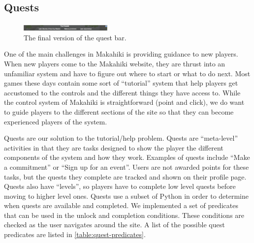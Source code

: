 \subsection{Quests}
\label{makahiki:components-quests}

\begin{figure}[h]
  \center
  \includegraphics[width=0.4\textwidth]{images/quest-bar-final.eps}
  \caption{The final version of the quest bar.}
  \label{fig:quest-bar-final}
\end{figure}

One of the main challenges in Makahiki is providing guidance to new players.  When new players come to the Makahiki website, they are thrust into an unfamiliar system and have to figure out where to start or what to do next.  Most games these days contain some sort of ``tutorial'' system that help players get accustomed to the controls and the different things they have access to.  While the control system of Makahiki is straightforward (point and click), we do want to guide players to the different sections of the site so that they can become experienced players of the system.

Quests are our solution to the tutorial/help problem.  Quests are ``meta-level'' activities in that they are tasks designed to show the player the different components of the system and how they work.  Examples of quests include ``Make a commitment'' or ``Sign up for an event''.  Users are not awarded points for these tasks, but the quests they complete are tracked and shown on their profile page.  Quests also have ``levels'', so players have to complete low level quests before moving to higher level ones.  Quests use a subset of Python in order to determine when quests are available and completed.  We implemented a set of predicates that can be used in the unlock and completion conditions.  These conditions are checked as the user navigates around the site. A list of the possible quest predicates are listed in \autoref{table:quest-predicates}.


